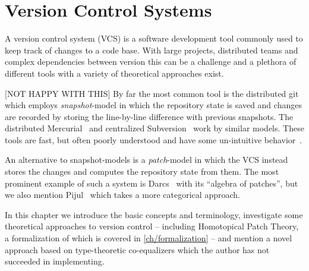 \chapter{Version Control Systems}

A version control system (VCS) is a software development tool commonly used to keep track of
changes to a code base. With large projects, distributed teams and complex
dependencies between version this can be a challenge and a plethora of different
tools with a variety of theoretical approaches exist.

[NOT HAPPY WITH THIS]
By far the most common tool is the distributed git~\cite{Git} which employs
\emph{snapshot}-model in which the repository state is saved and changes are
recorded by storing the line-by-line difference with previous snapshots.
The distributed Mercurial~\cite{Mercurial} and centralized
Subversion~\cite{Subversion} work by similar models. These tools are fast, but
often poorly understood and have some un-intuitive
behavior~\cite{git-inconsistent, badmerge}.

An alternative to snapshot-models is a \emph{patch}-model in which the VCS
instead stores the changes and computes the repository state from them. The most
prominent example of such a system is Darcs~\cite{Darcs} with its ``algebra of
patches'', but we also mention Pijul~\cite{Pijul} which takes a more categorical approach.

In this chapter we introduce the basic concepts and terminology, investigate some
theoretical approaches to version control -- including Homotopical Patch Theory,
a formalization of which is covered in \autoref{ch/formalization} -- and mention
a novel approach based on type-theoretic co-equalizers which the author has not
succeeded in implementing.